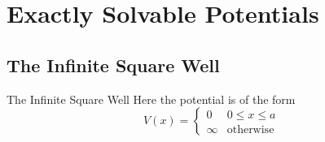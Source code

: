 \section[Potentials]{Exactly Solvable Potentials}

\subsection[Infinite Well]{The Infinite Square Well}

\begin{frame}{The Infinite Square Well}
	Here the potential is of the form
	\[
		V(x) = \begin{cases}
			0      & 0 \leq x \leq a  \\
			\infty & \text{otherwise}
		\end{cases}
	\]
\end{frame}
